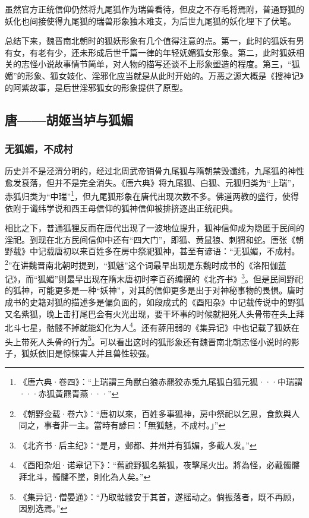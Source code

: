 \documentclass[UTF8, 12pt, A4paper]{article}
\begin{document}
虽然官方正统信仰仍然将九尾狐作为瑞兽看待，但皮之不存毛将焉附，普通野狐的妖化也间接使得九尾狐的瑞兽形象独木难支，为后世九尾狐的妖化埋下了伏笔。

总结下来，魏晋南北朝时的狐妖形象有几个值得注意的点。第一，此时的狐妖有男有女，有老有少，还未形成后世千篇一律的年轻妩媚狐女形象。第二，此时狐妖相关的志怪小说故事情节简单，对人物的描写还谈不上形象塑造的程度。第三，“狐媚”的形象、狐女妓化、淫邪化应当就是从此时开始的。万恶之源大概是《搜神记》的阿紫故事，是后世淫邪狐女的形象提供了原型。

\subsection{唐——胡姬当垆与狐媚}

\subsubsection{无狐媚，不成村}

历史并不是泾渭分明的，经过北周武帝销骨九尾狐与隋朝禁毁谶纬，九尾狐的神性愈发衰落，但并不是完全消失。《唐六典》将九尾狐、白狐、元狐归类为“上瑞”，赤狐归类为“中瑞”\footnote{《唐六典·卷四》：“上瑞謂三角獸白狼赤羆狡赤兎九尾狐白狐元狐···中瑞謂···赤狐黃羆青燕···”}，但九尾狐形象在唐代出现次数不多。佛道两教的盛行，使得依附于谶纬学说和西王母信仰的狐神信仰被排挤逐出正统祀典。

相比之下，普通狐狸反而在唐代出现了一波地位提升，狐神信仰成为隐匿于民间的淫祀。到现在北方民间信仰中还有“四大门”，即狐、黄鼠狼、刺猬和蛇。唐张《朝野载》中记载唐初以来百姓多在房中祭祀狐神，甚至有谚语：“无狐媚，不成村。\footnote{《朝野佥载·卷六》：“唐初以來，百姓多事狐神，房中祭祀以乞恩，食飲與人同之，事者非一主。當時有諺曰：「無狐魅，不成村。」”}”在讲魏晋南北朝时提到，“狐魅”这个词最早出现是东魏时成书的《洛阳伽蓝记》，而“狐媚”则最早出现在隋末唐初时李百药编撰的《北齐书》\footnote{《北齐书·后主纪》：“是月，邺都、并州并有狐媚，多截人发。”}。但是民间野祀的狐神，可能更多是一种“妖神”，对其的信仰更多是出于对神秘事物的畏惧。唐时成书的史籍对狐的描述多是偏负面的，如段成式的《酉阳杂》中记载传说中的野狐又名紫狐，晚上击打尾巴会有火光出现，要干坏事的时候就把死人头骨带在头上拜北斗七星，骷髅不掉就能幻化为人\footnote{《酉阳杂俎·诺皋记下》：“舊說野狐名紫狐，夜擊尾火出。將為怪，必戴髑髏拜北斗，髑髏不墜，則化為人矣。”}。还有薛用弱的《集异记》中也记载了狐妖在头上带死人头骨的行为\footnote{《集异记·僧晏通》：“乃取骷髅安于其首，遂摇动之。倘振落者，既不再顾，因别选焉。”}。可以看出这时的狐形象还有魏晋南北朝志怪小说时的影子，狐妖依旧是惊悚害人并且兽性较强。
\end{document}
